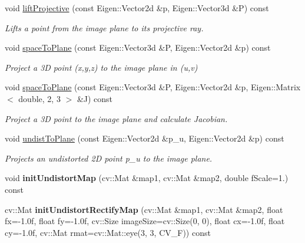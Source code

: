 \begin{DoxyCompactItemize}
void \hyperlink{classcamodocal_1_1EquidistantCamera_accd38ebf90227cc221d91dad7dd57dbb}{lift\+Projective} (const Eigen\+::\+Vector2d \&p, Eigen\+::\+Vector3d \&P) const
\begin{DoxyCompactList}\small\item\em Lifts a point from the image plane to its projective ray. \end{DoxyCompactList}\item 
void \hyperlink{classcamodocal_1_1EquidistantCamera_a04de4daf1568c2425eabdbade499f927}{space\+To\+Plane} (const Eigen\+::\+Vector3d \&P, Eigen\+::\+Vector2d \&p) const
\begin{DoxyCompactList}\small\item\em Project a 3D point ({\itshape x},{\itshape y},{\itshape z}) to the image plane in ({\itshape u},{\itshape v}) \end{DoxyCompactList}\item 
void \hyperlink{classcamodocal_1_1EquidistantCamera_af24c481afa7e454a687fcdc7726d443f}{space\+To\+Plane} (const Eigen\+::\+Vector3d \&P, Eigen\+::\+Vector2d \&p, Eigen\+::\+Matrix$<$ double, 2, 3 $>$ \&J) const
\begin{DoxyCompactList}\small\item\em Project a 3D point to the image plane and calculate Jacobian. \end{DoxyCompactList}\item 
void \hyperlink{classcamodocal_1_1EquidistantCamera_ac0aae0a472fac59ad5fc22079eb5560d}{undist\+To\+Plane} (const Eigen\+::\+Vector2d \&p\+\_\+u, Eigen\+::\+Vector2d \&p) const
\begin{DoxyCompactList}\small\item\em Projects an undistorted 2D point p\+\_\+u to the image plane. \end{DoxyCompactList}\item 
\mbox{\label{classcamodocal_1_1EquidistantCamera_a192665c52e98f0428a5a466565222f39}} 
void {\bfseries init\+Undistort\+Map} (cv\+::\+Mat \&map1, cv\+::\+Mat \&map2, double f\+Scale=1.) const
\item 
\mbox{\label{classcamodocal_1_1EquidistantCamera_a45135c8a95721c66c2f61b57b14adf07}} 
cv\+::\+Mat {\bfseries init\+Undistort\+Rectify\+Map} (cv\+::\+Mat \&map1, cv\+::\+Mat \&map2, float fx=-\/1.\+0f, float fy=-\/1.\+0f, cv\+::\+Size image\+Size=cv\+::\+Size(0, 0), float cx=-\/1.\+0f, float cy=-\/1.\+0f, cv\+::\+Mat rmat=cv\+::\+Mat\+::eye(3, 3, C\+V\+\_\+F)) const

\end{DoxyCompactItemize}

